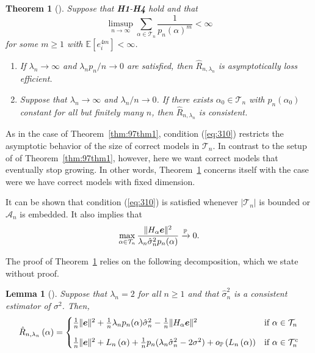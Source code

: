 \documentclass[11pt, letter paper]{article}
\newcommand{\1}{\mathmybb{1}}
\newtheorem{theorem}[proposition]{Theorem}
\newtheorem{lemma}[proposition]{Lemma}
\newcommand{\0}{\emptyset}
\newcommand{\prob}{\mathbb{P}}
\newcommand{\Ep}[1]{\mathbb{E}\left[ #1 \right]}
\newcommand{\paren}[1]{\left(#1 \right)}
\newcommand{\norm}[1]{|\hspace{-1pt}|#1 |\hspace{-1pt}|}
\newcommand{\normsq}[1]{\norm{#1}^{2}}
\newcommand{\Acal}{\mathcal{A}_{n}}
\newcommand{\Tcal}{\mathcal{T}_{n}}
\newcommand{\e}{\boldsymbol{e}}
\newcommand{\Loss}[1]{L_{n}\paren{#1}}
\newcommand{\Rhat}[2]{\hat{R}_{n, #1}\paren{#2}}
\newcommand{\op}[1]{o_{\prob}\paren{#1}}
\newcommand{\sigmahat}{\hat{\sigma}^{2}_{n}}
\begin{document}
\begin{theorem}[\cite{shao_1997}]\label{thm:97thm2}
    Suppose that \textbf{H1}-\textbf{H4} hold and that
    \begin{equation}\label{eq:310}
        \limsup_{n\to\infty}\sum_{\alpha\in\Tcal}\frac{1}{p_{n}{(\alpha)}^{m}}<\infty
    \end{equation}
    for some \(m\geq1\) with \(\Ep{e_{i}^{4m}}<\infty\).
    \begin{enumerate}
        \item If \(\lambda_{n}\to\infty\) and \(\lambda_{n}p_{n}/n \to 0\) are satisfied, then \(\hat{R}_{n,\lambda_{n}}\) is asymptotically loss efficient.
        \item Suppose that \(\lambda_{n}\to\infty\) and \(\lambda_{n}/n\to 0\). If there exists \(\alpha_{0}\in\Tcal\) with \(p_{n}(\alpha_{0})\) constant for all but finitely many \(n\), then \(\hat{R}_{n,\lambda_{n}}\) is consistent. 
    \end{enumerate}
\end{theorem}

As in the case of Theorem~\ref{thm:97thm1}, condition (\ref{eq:310}) restricts the asymptotic behavior of the size of correct models in \(\Tcal\). In contrast to the setup of of Theorem~\ref{thm:97thm1}, however, here we want correct models that eventually stop growing. In other words, Theorem~\ref{thm:97thm2} concerns itself with the case were we have correct models with fixed dimension.

It can be shown that condition (\ref{eq:310}) is satisfied whenever \(|\Tcal|\) is bounded or \(\Acal\) is embedded. It also implies that 
\begin{equation}\label{eq:310consequence}
    \max_{\alpha\in\Tcal} \frac{\normsq{H_{\alpha}\e}}{\lambda_{n}\sigmahat p_{n}(\alpha)}\xrightarrow{\prob} 0.
\end{equation}

The proof of Theorem~\ref{thm:97thm2} relies on the following decomposition, which we state without proof.

\begin{lemma}[\cite{shao_1997}]\label{prop:97decomp2}
    Suppose that \(\lambda_{n}=2\) for all \(n\geq 1\) and that \(\sigmahat\) is a consistent estimator of \(\sigma^{2}\). Then,
    \begin{equation}\label{eq:gicdecomp}
        \Rhat{\lambda_{n}}{\alpha} = \begin{cases}
            \frac{1}{n}\normsq{\e} + \frac{1}{n}\lambda_{n}p_{n}(\alpha)\sigmahat  - \frac{1}{n}\normsq{H_{\alpha}\e} &\text{if }\alpha\in\Tcal\\[3mm]
            \frac{1}{n}\normsq{\e} + \Loss{\alpha} + \frac{1}{n}p_{n}(\lambda_{n}\sigmahat - 2\sigma^{2}) + \op{\Loss{\alpha}} &\text{if }\alpha\in\Tcal^{c}
        \end{cases}
    \end{equation}
\end{lemma}
\end{document}
